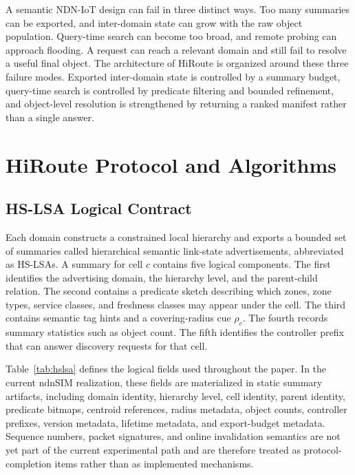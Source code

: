 \documentclass[journal]{IEEEtran}
\newcommand{\sysname}{HiRoute}
\newcommand{\hslsa}{HS-LSA}
\begin{document}
A semantic NDN-IoT design can fail in three distinct ways. Too many summaries can be exported, and inter-domain state can grow with the raw object population. Query-time search can become too broad, and remote probing can approach flooding. A request can reach a relevant domain and still fail to resolve a useful final object. The architecture of \sysname{} is organized around these three failure modes. Exported inter-domain state is controlled by a summary budget, query-time search is controlled by predicate filtering and bounded refinement, and object-level resolution is strengthened by returning a ranked manifest rather than a single answer.

\section{HiRoute Protocol and Algorithms}

\subsection{HS-LSA Logical Contract}

Each domain constructs a constrained local hierarchy and exports a bounded set of summaries called hierarchical semantic link-state advertisements, abbreviated as \hslsa{}s. A summary for cell $c$ contains five logical components. The first identifies the advertising domain, the hierarchy level, and the parent-child relation. The second contains a predicate sketch describing which zones, zone types, service classes, and freshness classes may appear under the cell. The third contains semantic tag hints and a covering-radius cue $\rho_c$. The fourth records summary statistics such as object count. The fifth identifies the controller prefix that can answer discovery requests for that cell.

Table~\ref{tab:hslsa} defines the logical fields used throughout the paper. In the current ndnSIM realization, these fields are materialized in static summary artifacts, including domain identity, hierarchy level, cell identity, parent identity, predicate bitmaps, centroid references, radius metadata, object counts, controller prefixes, version metadata, lifetime metadata, and export-budget metadata. Sequence numbers, packet signatures, and online invalidation semantics are not yet part of the current experimental path and are therefore treated as protocol-completion items rather than as implemented mechanisms.
\end{document}
